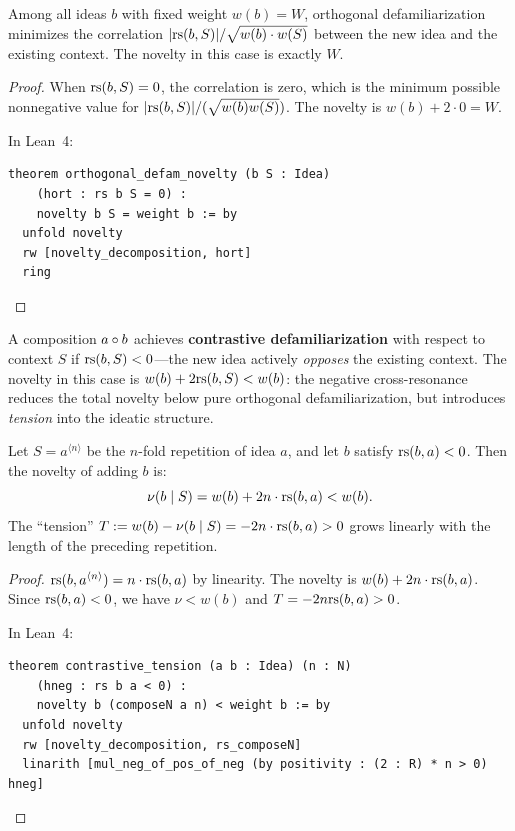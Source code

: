 \begin{theorem}
\label{thm:orthogonal-defam}
Among all ideas $b$ with fixed weight $w(b) = W$, orthogonal defamiliarization
minimizes the correlation $|\mathrm{rs}(b, S)|/\sqrt{w(b) \cdot w(S)}$ between the
new idea and the existing context.  The novelty in this case is exactly $W$.
\end{theorem}

\begin{proof}
When $\mathrm{rs}(b, S) = 0$, the correlation is zero, which is the minimum possible
nonnegative value for $|\mathrm{rs}(b, S)|/({\sqrt{w(b) w(S)}})$.  The novelty
is $w(b) + 2 \cdot 0 = W$.

In Lean~4:
\begin{lstlisting}
theorem orthogonal_defam_novelty (b S : Idea)
    (hort : rs b S = 0) :
    novelty b S = weight b := by
  unfold novelty
  rw [novelty_decomposition, hort]
  ring
\end{lstlisting}
\end{proof}

\begin{definition}
\label{def:contrastive-defam}
A composition $a \circ b$ achieves \textbf{contrastive defamiliarization}
with respect to context $S$ if $\mathrm{rs}(b, S) < 0$---the new idea actively
\emph{opposes} the existing context.  The novelty in this case is
$w(b) + 2\mathrm{rs}(b, S) < w(b)$: the negative cross-resonance reduces the total
novelty below pure orthogonal defamiliarization, but introduces \emph{tension}
into the ideatic structure.
\end{definition}

\begin{theorem}
\label{thm:contrastive-tension}
Let $S = a^{\langle n \rangle}$ be the $n$-fold repetition of idea $a$, and let $b$
satisfy $\mathrm{rs}(b, a) < 0$.  Then the novelty of adding $b$ is:
\[
  \nu(b \mid S) = w(b) + 2n \cdot \mathrm{rs}(b, a) < w(b).
\]
The ``tension'' $T := w(b) - \nu(b \mid S) = -2n \cdot \mathrm{rs}(b, a) > 0$
grows linearly with the length of the preceding repetition.
\end{theorem}

\begin{proof}
$\mathrm{rs}(b, a^{\langle n \rangle}) = n \cdot \mathrm{rs}(b, a)$ by linearity.  The novelty
is $w(b) + 2n \cdot \mathrm{rs}(b, a)$.  Since $\mathrm{rs}(b, a) < 0$, we have
$\nu < w(b)$ and $T = -2n \mathrm{rs}(b, a) > 0$.

In Lean~4:
\begin{lstlisting}
theorem contrastive_tension (a b : Idea) (n : N)
    (hneg : rs b a < 0) :
    novelty b (composeN a n) < weight b := by
  unfold novelty
  rw [novelty_decomposition, rs_composeN]
  linarith [mul_neg_of_pos_of_neg (by positivity : (2 : R) * n > 0) hneg]
\end{lstlisting}
\end{proof}

